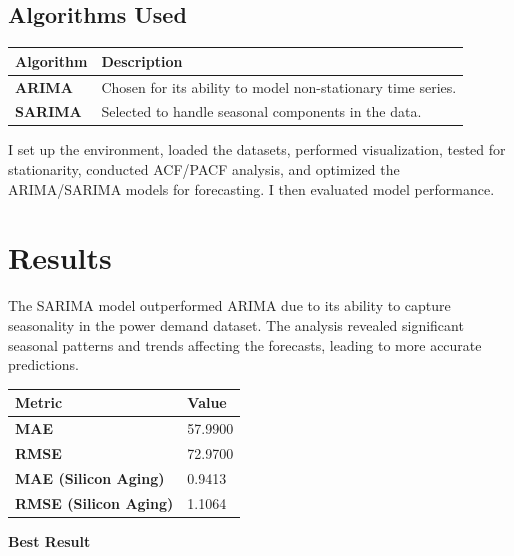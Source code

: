 \documentclass[11pt,a4paper]{article}
\begin{document}
\subsection{Algorithms Used}

\begin{tabularx}{\linewidth}{@{}>{\bfseries}l X @{}}
  \arrayrulecolor{tableheader}
  \toprule
  \rowcolor{tableheader} Algorithm & Description \\
  \midrule
  \rowcolor{white} ARIMA & Chosen for its ability to model non-stationary time series. \\
  \rowcolor{tablerow} SARIMA & Selected to handle seasonal components in the data. \\
  \bottomrule
\end{tabularx}

I set up the environment, loaded the datasets, performed visualization, tested for stationarity, conducted ACF/PACF analysis, and optimized the ARIMA/SARIMA models for forecasting. I then evaluated model performance.

\section{Results}

The SARIMA model outperformed ARIMA due to its ability to capture seasonality in the power demand dataset. The analysis revealed significant seasonal patterns and trends affecting the forecasts, leading to more accurate predictions.

\vspace{4pt}

\begin{tabularx}{\linewidth}{@{}>{\bfseries}l X @{}}
  \arrayrulecolor{tableheader}
  \toprule
  \rowcolor{tableheader} Metric & Value \\
  \midrule
  \rowcolor{white} MAE & 57.9900 \\
  \rowcolor{tablerow} RMSE & 72.9700 \\
  \rowcolor{white} MAE (Silicon Aging) & 0.9413 \\
  \rowcolor{tablerow} RMSE (Silicon Aging) & 1.1064 \\
  \bottomrule
\end{tabularx}

\vspace{4pt}
\begin{resultbox}
  \textbf{\color{accent}Best Result}
\end{resultbox}
\end{document}
